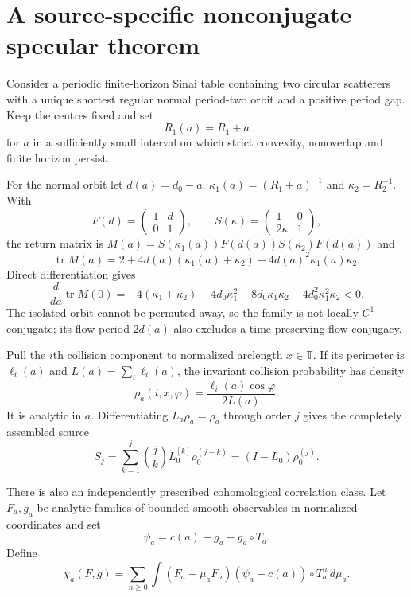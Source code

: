 \documentclass[11pt,reqno]{amsart}
\theoremstyle{definition}
\theoremstyle{remark}
\newcommand{\T}{\mathbb T}
\begin{document}
\section{A source-specific nonconjugate specular theorem}\label{sec:specular}

Consider a periodic finite-horizon Sinai table containing two circular
scatterers with a unique shortest regular normal period-two orbit and a
positive period gap.  Keep the centres fixed and set
\[
 R_1(a)=R_1+a
\]
for $a$ in a sufficiently small interval on which strict convexity,
nonoverlap and finite horizon persist.

For the normal orbit let $d(a)=d_0-a$,
$\kappa_1(a)=(R_1+a)^{-1}$ and $\kappa_2=R_2^{-1}$.  With
\[
 F(d)=\begin{pmatrix}1&d\\0&1\end{pmatrix},
 \qquad
 S(\kappa)=\begin{pmatrix}1&0\\2\kappa&1\end{pmatrix},
\]
the return matrix is
$M(a)=S(\kappa_1(a))F(d(a))S(\kappa_2)F(d(a))$ and
\begin{equation}\label{eq:trace}
 \operatorname{tr}M(a)
 =2+4d(a)(\kappa_1(a)+\kappa_2)
 +4d(a)^2\kappa_1(a)\kappa_2.
\end{equation}
Direct differentiation gives
\begin{equation}\label{eq:trace-der}
 \frac d{da}\operatorname{tr}M(0)
 =-4(\kappa_1+\kappa_2)-4d_0\kappa_1^2
 -8d_0\kappa_1\kappa_2-4d_0^2\kappa_1^2\kappa_2<0.
\end{equation}
The isolated orbit cannot be permuted away, so the family is not locally
$C^1$ conjugate; its flow period $2d(a)$ also excludes a time-preserving flow
conjugacy.

Pull the $i$th collision component to normalized arclength $x\in\T$.  If its
perimeter is $\ell_i(a)$ and $L(a)=\sum_i\ell_i(a)$, the invariant collision
probability has density
\begin{equation}\label{eq:rho}
 \rho_a(i,x,\varphi)=
 \frac{\ell_i(a)\cos\varphi}{2L(a)}.
\end{equation}
It is analytic in $a$.  Differentiating $L_a\rho_a=\rho_a$ through order $j$
gives the completely assembled source
\begin{equation}\label{eq:Sj}
 S_j=\sum_{k=1}^j{j\choose k}L_0^{[k]}
 \rho_0^{(j-k)}=(I-L_0)\rho_0^{(j)}.
\end{equation}

There is also an independently prescribed cohomological correlation class.
Let $F_a,g_a$ be analytic families of bounded smooth observables in normalized
coordinates and set
\[
 \psi_a=c(a)+g_a-g_a\circ T_a.
\]
Define
\[
 \chi_a(F,g)=\sum_{n\ge0}
 \int(F_a-\mu_aF_a)(\psi_a-c(a))\circ T_a^n\,d\mu_a.
\]
\end{document}
